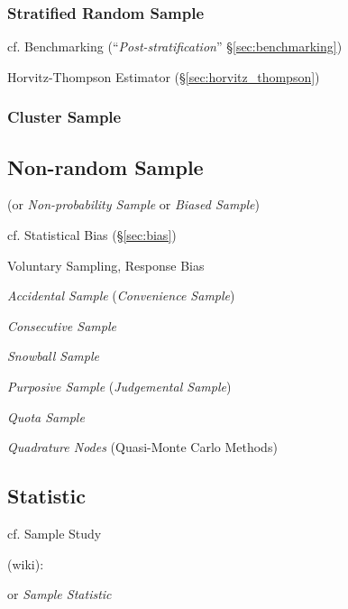 \subsubsection{Stratified Random Sample}\label{sec:stratified_sample}

cf. Benchmarking (``\emph{Post-stratification}'' \S\ref{sec:benchmarking})

Horvitz-Thompson Estimator (\S\ref{sec:horvitz_thompson})



\subsubsection{Cluster Sample}\label{sec:cluster_sample}



\subsection{Non-random Sample}\label{sec:nonrandom_sample}

(or \emph{Non-probability Sample} or \emph{Biased Sample})

cf. Statistical Bias (\S\ref{sec:bias})

Voluntary Sampling, Response Bias

\emph{Accidental Sample} (\emph{Convenience Sample})

\emph{Consecutive Sample}

\emph{Snowball Sample}

\emph{Purposive Sample} (\emph{Judgemental Sample})

\emph{Quota Sample}

\emph{Quadrature Nodes} (Quasi-Monte Carlo Methods) %



\subsection{Statistic}\label{sec:statistic}

cf. Sample Study

(wiki):

or \emph{Sample Statistic}

